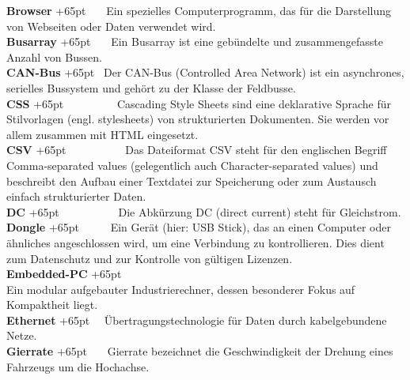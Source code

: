 \documentclass[fontsize = 12pt, paper = a4]{scrreprt}
\begin{document}
\textbf{Browser}
\hangindent+65pt 
\ \ \ Ein spezielles Computerprogramm, das für die Darstellung von Webseiten oder Daten verwendet wird.\\

\textbf{Busarray}
\hangindent+65pt 
\ \ \ Ein Busarray ist eine gebündelte und zusammengefasste Anzahl von Bussen.\\

\textbf{CAN-Bus}
\hangindent+65pt 
\ Der CAN-Bus (Controlled Area Network) ist ein asynchrones, serielles Bussystem und gehört zu der Klasse der Feldbusse.\\

\textbf{CSS}
\hangindent+65pt 
\ \ \ \ \ \ \ \ \   Cascading Style Sheets sind eine deklarative Sprache für Stilvorlagen (engl. stylesheets) von strukturierten Dokumenten. Sie werden vor allem zusammen mit HTML eingesetzt.\\


\textbf{CSV}
\hangindent+65pt 
\ \ \ \ \ \ \ \ \ \  Das Dateiformat CSV steht für den englischen Begriff Comma-separated values (gelegentlich auch Character-separated values) und beschreibt den Aufbau einer Textdatei zur Speicherung oder zum Austausch einfach strukturierter Daten.\\

\textbf{DC}
\hangindent+65pt 
\ \ \ \ \ \ \ \ \ \ Die Abkürzung DC (direct current) steht für Gleichstrom.\\

\textbf{Dongle}
\hangindent+65pt 
\ \ \ \ \ Ein Gerät (hier: USB Stick), das an einen Computer oder ähnliches angeschlossen wird, um eine Verbindung zu kontrollieren. Dies dient zum Datenschutz und zur Kontrolle von gültigen Lizenzen.\\

\textbf{Embedded-PC}
\hangindent+65pt  \\
Ein modular aufgebauter Industrierechner, dessen besonderer Fokus auf Kompaktheit liegt.\\

\textbf{Ethernet}
\hangindent+65pt  
\ \ Übertragungstechnologie für Daten durch kabelgebundene Netze.\\

\textbf{Gierrate}
\hangindent+65pt  
\ \ \ Gierrate bezeichnet die Geschwindigkeit der Drehung eines Fahrzeugs um die Hochachse.\\
\end{document}
